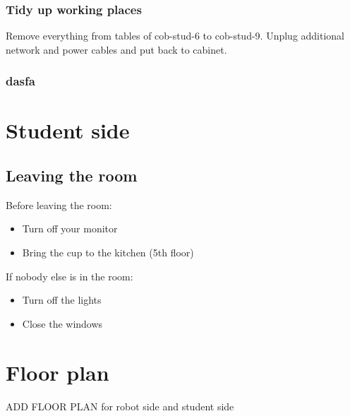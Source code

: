 \subsubsection{Tidy up working places}
Remove everything from tables of cob-stud-6 to cob-stud-9.
Unplug additional network and power cables and put back to cabinet.

\subsubsection{dasfa}


\section{Student side}
\subsection{Leaving the room}
Before leaving the room:
\begin{itemize}
\item Turn off your monitor
\item Bring the cup to the kitchen (5th floor)
\end{itemize}
If nobody else is in the room:
\begin{itemize}
\item Turn off the lights
\item Close the windows
\end{itemize}

\section{Floor plan}
ADD FLOOR PLAN for robot side and student side
